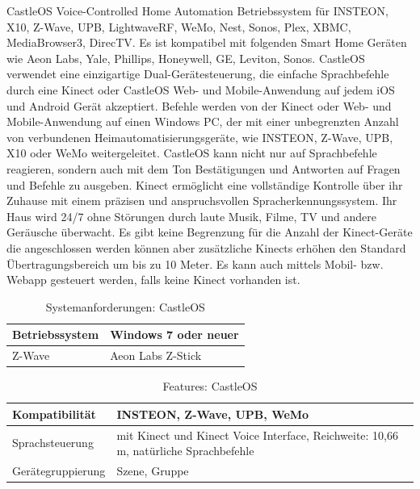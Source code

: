 \noindent
CastleOS Voice-Controlled Home Automation Betriebssystem für INSTEON, X10, Z-Wave, UPB, LightwaveRF, WeMo, Nest, Sonos, Plex, XBMC, MediaBrowser3, DirecTV. Es ist kompatibel mit folgenden Smart Home Geräten wie Aeon Labs, Yale, Phillips, Honeywell, GE, Leviton, Sonos. CastleOS verwendet eine einzigartige Dual-Gerätesteuerung, die einfache Sprachbefehle durch eine Kinect oder CastleOS Web- und Mobile-Anwendung auf jedem iOS und Android Gerät akzeptiert. Befehle werden von der Kinect oder Web- und Mobile-Anwendung auf einen Windows PC, der mit einer unbegrenzten Anzahl von verbundenen Heimautomatisierungsgeräte, wie INSTEON, Z-Wave, UPB, X10 oder WeMo weitergeleitet. CastleOS kann nicht nur auf Sprachbefehle reagieren, sondern auch mit dem Ton Bestätigungen und Antworten auf Fragen und Befehle zu ausgeben. Kinect ermöglicht eine vollständige Kontrolle über ihr Zuhause mit einem präzisen und anspruchsvollen Spracherkennungssystem. Ihr Haus wird 24/7 ohne Störungen durch laute Musik, Filme, TV und andere Geräusche überwacht. Es gibt keine Begrenzung für die Anzahl der Kinect-Geräte die angeschlossen werden können aber zusätzliche Kinects erhöhen den Standard Übertragungsbereich um bis zu 10 Meter. Es kann auch mittels Mobil- bzw. Webapp gesteuert werden, falls keine Kinect vorhanden ist.

\begin{table}[H]
	\begin{tabularx}{\textwidth}{
			>{\hsize=0.5\hsize}X 
			>{\hsize=1.5\hsize}X
		}
		\hline
		Betriebssystem	
		& Windows 7 oder neuer \\
		\hline 
		Z-Wave
		& Aeon Labs Z-Stick \\
		\hline
	\end{tabularx}
	\caption{Systemanforderungen: CastleOS}
\end{table}

\begin{table}[H]
	\begin{tabularx}{\textwidth}{
			>{\hsize=0.5\hsize}X 
			>{\hsize=1.5\hsize}X
		}
		\hline
		Kompatibilität	
		& INSTEON, Z-Wave, UPB, WeMo \\
		\hline 
		Sprachsteuerung
		& mit Kinect und Kinect Voice Interface, Reichweite: 10,66 m, natürliche Sprachbefehle \\
		\hline 
		Gerätegruppierung
		& Szene, Gruppe \\
		\hline
	\end{tabularx}
	\caption{Features: CastleOS}
\end{table}

